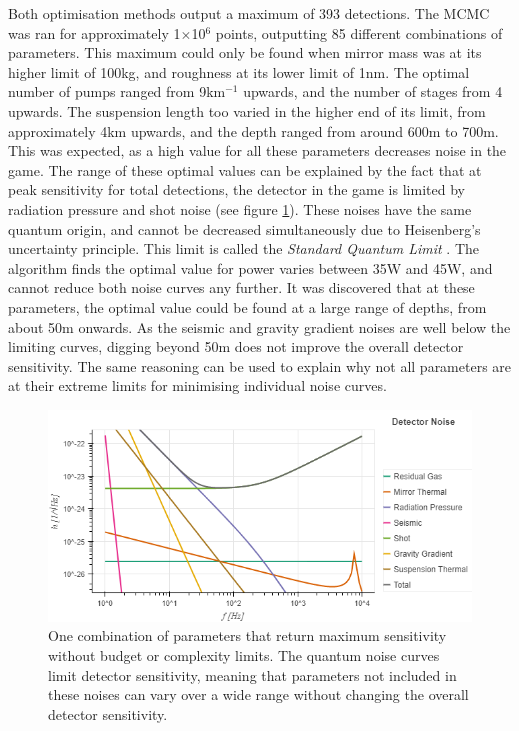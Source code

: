 \documentclass{article}
\begin{document}
Both optimisation methods output a maximum of 393 detections. The MCMC
was ran for approximately 1$\times$10$^6$ points, outputting 85
different combinations of parameters. This maximum could only be found
when mirror mass was at its higher limit of 100kg, and roughness at
its lower limit of 1nm. The optimal number of pumps ranged from
9km$^{-1}$ upwards, and the number of stages from 4 upwards. The
suspension length too varied in the higher end of its limit, from
approximately 4km upwards, and the depth ranged from around 600m to
700m. This was expected, as a high value for all these parameters
decreases noise in the game. The range of these optimal values can be
explained by the fact that at peak sensitivity for total detections,
the detector in the game is limited by radiation pressure and shot
noise (see figure \ref{fig::SPQMaxNoLim}). These noises have the same
quantum origin, and cannot be decreased simultaneously due to
Heisenberg's uncertainty principle. This limit is called the
\textit{Standard Quantum Limit} \cite{danilishin}. The algorithm finds
the optimal value for power varies between 35W and 45W, and cannot
reduce both noise curves any further. It was discovered that at these
parameters, the optimal value could be found at a large range of
depths, from about 50m onwards. As the seismic and gravity gradient
noises are well below the limiting curves, digging beyond 50m does not
improve the overall detector sensitivity. The same reasoning can be
used to explain why not all parameters are at their extreme limits for
minimising individual noise curves. 

\begin{figure}[h!]
    \centering
    \includegraphics[scale=0.55]{SPQMaxNoLim.png}
    \captionsetup{width=0.9\textwidth}
    \caption{One combination of parameters that return maximum
      sensitivity without budget or complexity limits. The quantum
      noise curves limit detector sensitivity, meaning that parameters
      not included in these noises can vary over a wide range without
      changing the overall detector sensitivity.}
    \label{fig::SPQMaxNoLim}
\end{figure}
\end{document}
